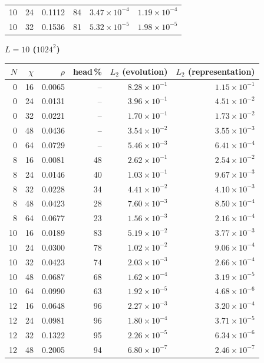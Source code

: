 {\begin{tabular}{rrrrrr}
10 & 24 & 0.1112 & 84 & $3.47\times10^{-4}$ & $1.19\times10^{-4}$\\
10 & 32 & 0.1536 & 81 & $5.32\times10^{-5}$ & $1.98\times10^{-5}$\\
\bottomrule
\end{tabular}
\vspace{6pt}
\textbf{$L=10$ ($1024^2$)}\\[2pt]
\begin{tabular}{rrrrrr}
\toprule
$N$ & $\chi$ & $\rho$ & head\,\% & $L_2$ (evolution) & $L_2$ (representation)\\
\midrule
0 & 16 & 0.0065 & -- & $8.28\times10^{-1}$ & $1.15\times10^{-1}$\\
0 & 24 & 0.0131 & -- & $3.96\times10^{-1}$ & $4.51\times10^{-2}$\\
0 & 32 & 0.0221 & -- & $1.70\times10^{-1}$ & $1.73\times10^{-2}$\\
0 & 48 & 0.0436 & -- & $3.54\times10^{-2}$ & $3.55\times10^{-3}$\\
0 & 64 & 0.0729 & -- & $5.46\times10^{-3}$ & $6.41\times10^{-4}$\\
8 & 16 & 0.0081 & 48 & $2.62\times10^{-1}$ & $2.54\times10^{-2}$\\
8 & 24 & 0.0146 & 40 & $1.03\times10^{-1}$ & $9.67\times10^{-3}$\\
8 & 32 & 0.0228 & 34 & $4.41\times10^{-2}$ & $4.10\times10^{-3}$\\
8 & 48 & 0.0423 & 28 & $7.60\times10^{-3}$ & $8.50\times10^{-4}$\\
8 & 64 & 0.0677 & 23 & $1.56\times10^{-3}$ & $2.16\times10^{-4}$\\
10 & 16 & 0.0189 & 83 & $5.19\times10^{-2}$ & $3.77\times10^{-3}$\\
10 & 24 & 0.0300 & 78 & $1.02\times10^{-2}$ & $9.06\times10^{-4}$\\
10 & 32 & 0.0423 & 74 & $2.03\times10^{-3}$ & $2.66\times10^{-4}$\\
10 & 48 & 0.0687 & 68 & $1.62\times10^{-4}$ & $3.19\times10^{-5}$\\
10 & 64 & 0.0990 & 63 & $1.92\times10^{-5}$ & $4.68\times10^{-6}$\\
12 & 16 & 0.0648 & 96 & $2.27\times10^{-3}$ & $3.20\times10^{-4}$\\
12 & 24 & 0.0981 & 96 & $1.80\times10^{-4}$ & $3.71\times10^{-5}$\\
12 & 32 & 0.1322 & 95 & $2.26\times10^{-5}$ & $6.34\times10^{-6}$\\
12 & 48 & 0.2005 & 94 & $6.80\times10^{-7}$ & $2.46\times10^{-7}$\\

\end{tabular}}
